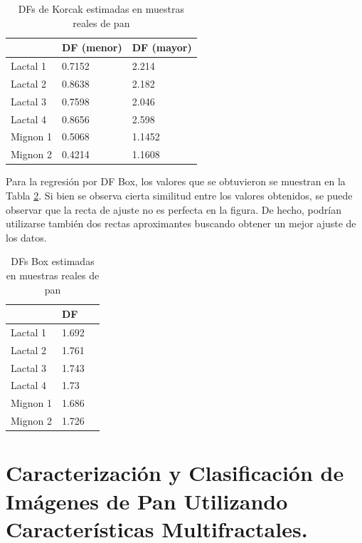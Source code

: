 \begin{table}
\center
\begin{tabular}{|| l | l | l ||}
    \hline
     & DF (menor) & DF (mayor) \\    
    \hline
    Lactal 1 & 0.7152 & 2.214 \\
    \hline
    Lactal 2 & 0.8638 & 2.182 \\
    \hline
    Lactal 3 & 0.7598 & 2.046 \\
    \hline
    Lactal 4 & 0.8656 & 2.598 \\
    \hline
    Mignon 1 & 0.5068 & 1.1452\\
    \hline
    Mignon 2 & 0.4214 & 1.1608\\
    \hline
\end{tabular}
\caption{DFs de Korcak estimadas en muestras reales de pan}
\label{tab:korcak}
\end{table}


Para la regresi\'on por DF Box, los valores que se obtuvieron se muestran en la Tabla \ref{tab:box}.
Si bien se observa cierta similitud entre los valores obtenidos, se puede observar que la recta de ajuste no es perfecta en la figura.
De hecho, podrían utilizarse también dos rectas aproximantes buscando obtener un mejor ajuste de los datos.

\begin{table}
\begin{center}
\begin{tabular}{|| l | l | l ||}
    \hline
     & DF \\    
    \hline
    Lactal 1 & 1.692 \\
    \hline
    Lactal 2 & 1.761 \\
    \hline
    Lactal 3 & 1.743\\
    \hline
    Lactal 4 & 1.73 \\
    \hline
    Mignon 1 & 1.686 \\
    \hline
    Mignon 2 & 1.726 \\
    \hline
\end{tabular}
\caption{DFs Box estimadas en muestras reales de pan}
\label{tab:box}
\end{center}
\end{table}

\section[Características Multifractales del pan]{Caracterización y Clasificación de Imágenes de Pan Utilizando Características Multifractales.}

